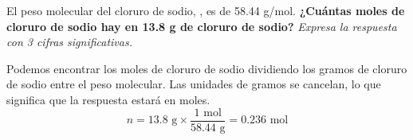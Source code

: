 El peso molecular del cloruro de sodio, , es de 58.44 g/mol.
\textbf{¿Cuántas moles de cloruro de sodio hay en 13.8 g de cloruro de sodio?}
\emph{Expresa la respuesta con 3 cifras significativas.}

\begin{solutionbox}{4cm}
    Podemos encontrar los moles de cloruro de sodio dividiendo los gramos de cloruro de sodio entre el peso molecular. Las unidades de gramos se cancelan, lo que significa que la respuesta estará en moles.
    \[ n =  13.8 \text{ g} \times \frac{1 \text{ mol}}{58.44 \text{ g}} = 0.236 \text{ mol} \]
\end{solutionbox}